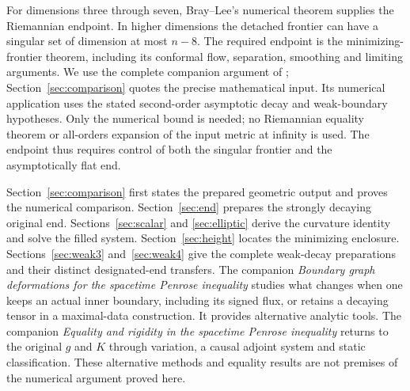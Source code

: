 For dimensions three through seven, Bray--Lee's numerical theorem
supplies the Riemannian endpoint. In higher dimensions the detached
frontier can have a singular set of dimension at most $n-8$. The required
endpoint is the minimizing-frontier theorem, including its conformal
flow, separation, smoothing and limiting arguments. We use the complete companion argument of \cite{RiemannianCompanion};
Section~\ref{sec:comparison} quotes the precise mathematical input. Its numerical application uses the stated
second-order asymptotic decay and weak-boundary hypotheses. Only the
numerical bound is needed; no Riemannian equality theorem or all-orders
expansion of the input metric at infinity is used. The endpoint thus
requires control of both the singular frontier and the asymptotically
flat end.

Section~\ref{sec:comparison} first states the prepared geometric output
and proves the numerical comparison. Section~\ref{sec:end} prepares the
strongly decaying original end. Sections~\ref{sec:scalar} and
\ref{sec:elliptic} derive the curvature identity and solve the filled
system. Section~\ref{sec:height} locates the minimizing enclosure.
Sections~\ref{sec:weak3} and~\ref{sec:weak4} give the complete weak-decay
preparations and their distinct designated-end transfers.
The companion \emph{Boundary graph deformations for the spacetime
Penrose inequality} \cite{BoundaryCompanion} studies what changes when
one keeps an actual inner boundary, including its signed flux, or
retains a decaying tensor in a maximal-data construction. It provides
alternative analytic tools. The companion \emph{Equality and rigidity
in the spacetime Penrose inequality} \cite{RigidityCompanion} returns
to the original $g$ and $K$ through variation, a causal adjoint system
and static classification. These alternative methods and equality
results are not premises of the numerical argument proved here.

